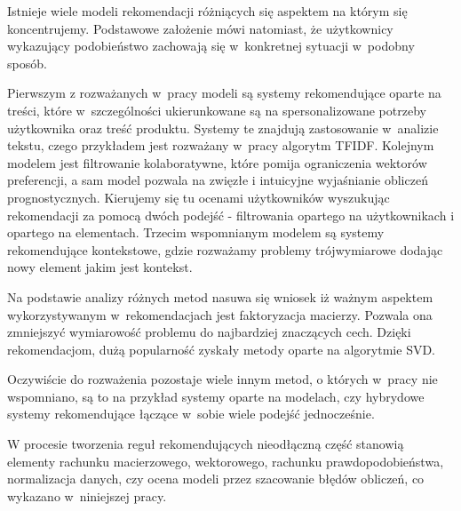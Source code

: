 \documentclass[12pt,a4paper]{report}
\begin{document}
Istnieje wiele modeli rekomendacji różniących się aspektem na którym się koncentrujemy. Podstawowe założenie mówi natomiast, że użytkownicy wykazujący podobieństwo zachowają się w~konkretnej sytuacji w~podobny sposób.

Pierwszym z rozważanych w~pracy modeli są systemy rekomendujące oparte na treści, które w~szczególności ukierunkowane są na spersonalizowane potrzeby użytkownika oraz treść produktu. Systemy te znajdują zastosowanie w~analizie tekstu, czego przykładem jest rozważany w~pracy algorytm TFIDF. Kolejnym modelem jest filtrowanie kolaboratywne, które pomija ograniczenia wektorów preferencji, a sam model pozwala na zwięzłe i intuicyjne wyjaśnianie obliczeń prognostycznych. Kierujemy się tu ocenami użytkowników wyszukując rekomendacji za pomocą dwóch podejść - filtrowania opartego na użytkownikach i opartego na elementach. Trzecim wspomnianym modelem są systemy rekomendujące kontekstowe, gdzie rozważamy problemy trójwymiarowe dodając nowy element jakim jest kontekst.

Na podstawie analizy różnych metod nasuwa się wniosek iż ważnym aspektem wykorzystywanym w~rekomendacjach jest faktoryzacja macierzy. Pozwala ona zmniejszyć wymiarowość problemu do najbardziej znaczących cech. Dzięki rekomendacjom, dużą popularność zyskały metody oparte na algorytmie SVD.

Oczywiście do rozważenia pozostaje wiele innym metod, o których w~pracy nie wspomniano, są to na przykład systemy oparte na modelach, czy hybrydowe systemy rekomendujące łączące w~sobie wiele podejść jednocześnie.

W procesie tworzenia reguł rekomendujących nieodłączną część stanowią elementy rachunku macierzowego, wektorowego, rachunku prawdopodobieństwa, normalizacja danych, czy ocena modeli przez szacowanie błędów obliczeń, co wykazano w~niniejszej pracy. 




\end{document}
